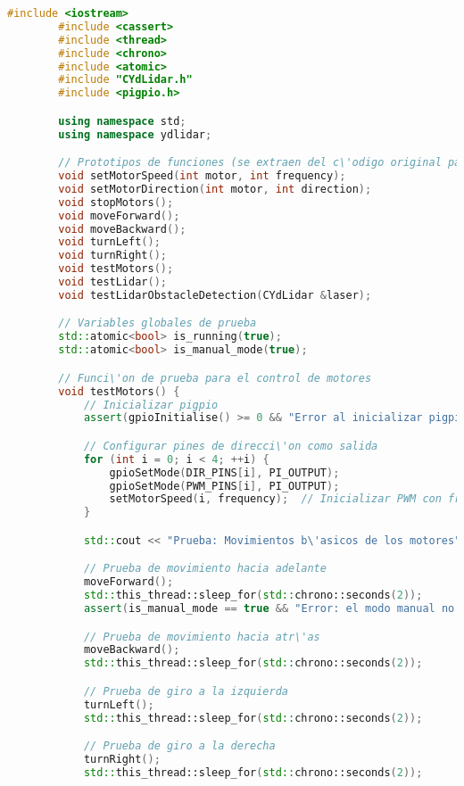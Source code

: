     \begin{lstlisting}[language={C++}, caption={C\'odigo de pruebas de integraci\'organismo}, label={swsa}]
        #include <iostream>
        #include <cassert>
        #include <thread>
        #include <chrono>
        #include <atomic>
        #include "CYdLidar.h"
        #include <pigpio.h>

        using namespace std;
        using namespace ydlidar;

        // Prototipos de funciones (se extraen del c\'odigo original para modularizaci\'on)
        void setMotorSpeed(int motor, int frequency);
        void setMotorDirection(int motor, int direction);
        void stopMotors();
        void moveForward();
        void moveBackward();
        void turnLeft();
        void turnRight();
        void testMotors();
        void testLidar();
        void testLidarObstacleDetection(CYdLidar &laser);

        // Variables globales de prueba
        std::atomic<bool> is_running(true);
        std::atomic<bool> is_manual_mode(true);

        // Funci\'on de prueba para el control de motores
        void testMotors() {
            // Inicializar pigpio
            assert(gpioInitialise() >= 0 && "Error al inicializar pigpio.");

            // Configurar pines de direcci\'on como salida
            for (int i = 0; i < 4; ++i) {
                gpioSetMode(DIR_PINS[i], PI_OUTPUT);
                gpioSetMode(PWM_PINS[i], PI_OUTPUT);
                setMotorSpeed(i, frequency);  // Inicializar PWM con frecuencia inicial
            }

            std::cout << "Prueba: Movimientos b\'asicos de los motores" << std::endl;

            // Prueba de movimiento hacia adelante
            moveForward();
            std::this_thread::sleep_for(std::chrono::seconds(2));
            assert(is_manual_mode == true && "Error: el modo manual no est\'a activo durante la prueba de movimiento hacia adelante.");

            // Prueba de movimiento hacia atr\'as
            moveBackward();
            std::this_thread::sleep_for(std::chrono::seconds(2));

            // Prueba de giro a la izquierda
            turnLeft();
            std::this_thread::sleep_for(std::chrono::seconds(2));

            // Prueba de giro a la derecha
            turnRight();
            std::this_thread::sleep_for(std::chrono::seconds(2));


\end{lstlisting}
